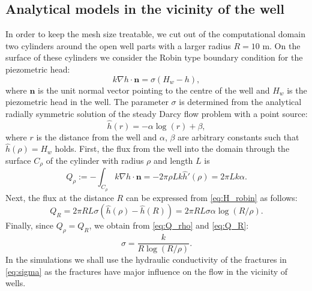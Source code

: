 \documentclass{article}
\newcommand{\eq}[1]{\begin{equation}#1\end{equation}}
\newcommand{\nn}{\vc n}
\newcommand{\vc}[1]{\boldsymbol{#1}}
\begin{document}








\subsection{Analytical models in the vicinity of the well}
In order to keep the mesh size treatable, we cut out of the computational domain two cylinders around the open well parts with a larger radius $R=10$ m. On the surface of these cylinders we consider the Robin type boundary condition for the piezometric head:
%
\eq{\label{eq:H_robin} k\nabla h\cdot\nn = \sigma(H_w-h), }
%
where $\nn$ is the unit normal vector pointing to the centre of the well and $H_w$ is the piezometric head in the well.
The parameter $\sigma$ is determined from the analytical radially symmetric solution
of the steady Darcy flow problem with a point source:
\[
    \hat h(r) = -\alpha \log (r) + \beta,
\]
where $r$ is the distance from the well and $\alpha$, $\beta$ are arbitrary constants such that $\hat h(\rho)=H_w$ holds.
First, the flux from the well into the domain through the surface $C_\rho$ of the cylinder with radius $\rho$ and length $L$ is
%  
\eq{\label{eq:Q_rho}    Q_\rho := -\int_{C_\rho} k\nabla h\cdot\nn = -2\pi \rho L k \hat h'(\rho) = 2\pi L k \alpha. }
%
Next, the flux at the distance $R$ can be expressed from \eqref{eq:H_robin} as follows:
%
\eq{\label{eq:Q_R}   Q_R = 2\pi R L \sigma (\hat h(\rho) - \hat h(R)) = 2\pi R L \sigma \alpha \log(R/\rho).}
%
Finally, since $Q_\rho=Q_R$, we obtain from \eqref{eq:Q_rho} and \eqref{eq:Q_R}:
\eq{ \label{eq:sigma} \sigma = \frac{k}{R\log(R/\rho)}. }
In the simulations we shall use the hydraulic conductivity of the fractures in \eqref{eq:sigma} as the fractures have major influence on the flow in the vicinity of wells.
\end{document}
